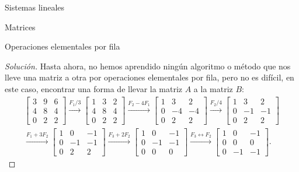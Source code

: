 \begin{chapter}{Sistemas lineales}
\begin{section}{Matrices}
\begin{subsection}{Operaciones elementales por fila}
                    \begin{proof}[Solución]				
                    Hasta ahora, no hemos aprendido ningún algoritmo o método que nos lleve una matriz a otra por operaciones elementales por fila, pero no es difícil, en este caso, encontrar una forma de llevar la matriz $A$ a la matriz $B$:
                    \begin{multline*}
                    \begin{bmatrix}
                    3 & 9 & 6 \\ 4&8&4 \\ 0&2&2
                    \end{bmatrix} \stackrel{F_1/3}{\longrightarrow}
                    \begin{bmatrix}
                    1 & 3 & 2 \\ 4&8&4 \\ 0&2&2
                    \end{bmatrix} \stackrel{F_2 -4F_1}{\longrightarrow}
                    \begin{bmatrix}
                    1 & 3 & 2 \\ 0&-4&-4 \\ 0&2&2
                    \end{bmatrix}                    
                    \stackrel{F_2/4}{\longrightarrow}  \begin{bmatrix}
                    1 & 3 & 2 \\ 0&-1&-1 \\ 0&2&2 
                    \end{bmatrix} \\
                    \stackrel{F_1 + 3F_2}{\longrightarrow} 
                    \begin{bmatrix}
                    1 & 0& -1 \\ 0&-1&-1 \\ 0&2&2 
                    \end{bmatrix} \stackrel{F_3 + 2F_2}{\longrightarrow} 
                    \begin{bmatrix}
                    1 & 0& -1 \\ 0&-1&-1 \\ 0&0&0 
                    \end{bmatrix} \stackrel{F_3\leftrightarrow F_2}{\longrightarrow} 
                    \begin{bmatrix}
                    1 & 0& -1 \\ 0&0&0\\  0&-1&-1 
                    \end{bmatrix}.
                    \end{multline*}
                    

\end{proof}
\end{subsection}
\end{section}
\end{chapter}
